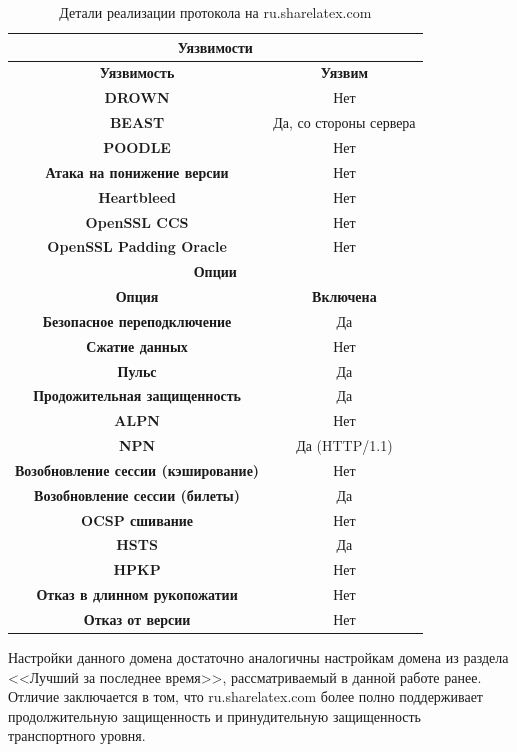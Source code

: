 \begin{table}[H]
    \centering
    \begin{tabular}{c|c}
        \hline
        \multicolumn{2}{c}{\textbf{Уязвимости}} \\ \hline
        \textbf{Уязвимость} & \textbf{Уязвим} \\ \hline
        \textbf{DROWN} & Нет \\
        \textbf{BEAST} & Да, со стороны сервера \\
        \textbf{POODLE} & Нет \\
        \textbf{Атака на понижение версии} & Нет \\
        \textbf{Heartbleed} & Нет \\
        \textbf{OpenSSL CCS} & Нет \\
        \textbf{OpenSSL Padding Oracle} & Нет \\ \hline
        \multicolumn{2}{c}{\textbf{Опции}} \\ \hline
        \textbf{Опция} & \textbf{Включена} \\ \hline 
        \textbf{Безопасное переподключение} & Да \\ 
        \textbf{Сжатие данных} & Нет \\ 
        \textbf{Пульс} & Да \\ 
        \textbf{Продожительная защищенность} & Да \\ 
        \textbf{ALPN} & Нет \\ 
        \textbf{NPN} & Да (HTTP/1.1) \\ 
        \textbf{Возобновление сессии (кэширование)} & Нет \\
        \textbf{Возобновление сессии (билеты)} & Да  \\
        \textbf{OCSP сшивание} & Нет  \\
        \textbf{HSTS} & Да \\ 
        \textbf{HPKP} & Нет \\ 
        \textbf{Отказ в длинном рукопожатии} & Нет \\ 
        \textbf{Отказ от версии} & Нет \\ 
    \end{tabular}
    \caption{Детали реализации протокола на ru.sharelatex.com}
    \label{03-protocol-details}
\end{table}

Настройки данного домена достаточно аналогичны настройкам домена из раздела <<Лучший за последнее время>>, рассматриваемый в данной
работе ранее. Отличие заключается в том, что ru.sharelatex.com более полно поддерживает продолжительную защищенность и принудительную
защищенность транспортного уровня.